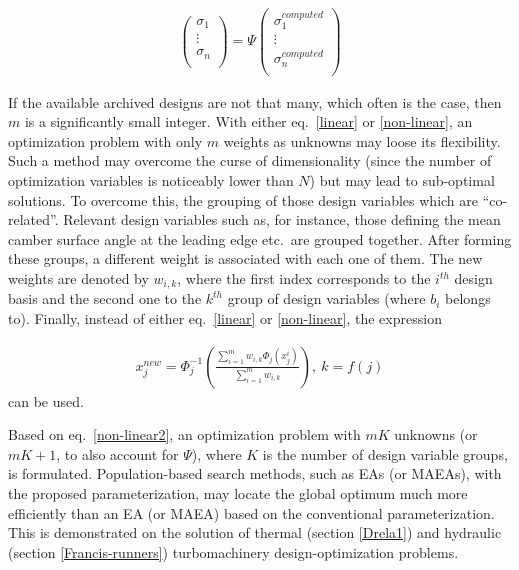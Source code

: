 \begin{eqnarray}
		\left( {\begin{array}{c}
 		\sigma _1  \\
 		\vdots  \\
 		\sigma _n  \\
 		\end{array} } \right) =
 		\Psi  
 		\left( {\begin{array}{c}
 		\sigma _1^{computed}  \\
 		\vdots  \\
 		\sigma _n^{computed}  \\
 		\end{array} } \right)
   \label{cdf-matrix} 
\end{eqnarray}


If the available archived designs are not that many, which often is the case, then $m$ is a significantly small integer.  With either eq.\ \ref{linear} or \ref{non-linear}, an optimization problem with only $m$ weights as unknowns may loose its flexibility. Such a method may overcome the curse of dimensionality (since the number of optimization variables is  noticeably lower than $N$) but may lead to sub-optimal solutions. To overcome this, the grouping of those design variables which are ``co-related''. Relevant design variables such as, for instance, those defining the mean camber surface angle at the leading edge etc.\ are grouped together. After forming these groups, a different weight is associated with each one of them. The new weights are denoted by $w_{i,k}$, where the first index corresponds to the $i^{th}$ design basis and the second one to the $k^{th}$ group of design variables (where $b_i$ belongs to). Finally, instead of either eq.\ \ref{linear} or \ref{non-linear}, the expression


\begin{eqnarray}
   x_j^{new} = \Phi _j^{-1} (\frac{\sum_{i=1}^{m}w_{i,k} \Phi _j(x_j^i)}{\sum_{i=1}^{m}w_{i,k} }),~ k=f(j) 
   \label{non-linear2} 
\end{eqnarray}
can be used. 

Based on eq.\ \ref{non-linear2}, an optimization problem with $m  K$ unknowns (or $m K\!+\!1$, to also account for $\Psi$), where $K$ is the number of design variable groups, is formulated. Population-based search methods, such as EAs (or MAEAs), with the proposed parameterization, may locate the global optimum much more efficiently than an EA (or MAEA) based on the conventional parameterization. This is demonstrated on the solution of  thermal (section \ref{Drela1}) and hydraulic (section \ref{Francis-runners}) turbomachinery design-optimization problems. 


